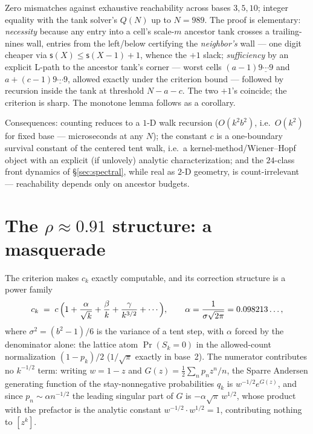 \documentclass[11pt]{article}
\theoremstyle{definition}
\theoremstyle{remark}
\newcommand{\ds}{\mathsf{s}}
\begin{document}
Zero mismatches against exhaustive reachability across bases $3,5,10$; integer
equality with the tank solver's $Q(N)$ up to $N=989$. The proof is elementary:
\emph{necessity} because any entry into a cell's scale-$m$ ancestor tank crosses
a trailing-nines wall, entries from the left/below certifying the
\emph{neighbor's} wall --- one digit cheaper via $\ds(X)\le\ds(X{-}1)+1$, whence
the $+1$ slack; \emph{sufficiency} by an explicit L-path to the ancestor tank's
corner --- worst cells $(a{-}1)\underline{9\cdots9}$ and
$a+(c{-}1)\underline{9\cdots9}$, allowed exactly under the criterion bound ---
followed by recursion inside the tank at threshold $N-a-c$. The two $+1$'s
coincide; the criterion is sharp. The monotone lemma follows as a corollary.

Consequences: counting reduces to a $1$-D walk recursion ($O(k^2b^2)$, i.e.\
$O(k^2)$ for fixed base ---
microseconds at any $N$); the constant $c$ is a one-boundary survival constant of
the centered tent walk, i.e.\ a kernel-method/Wiener--Hopf object with an
explicit (if unlovely) analytic characterization; and the $24$-class front
dynamics of \S\ref{sec:spectral}, while real as $2$-D geometry, is
count-irrelevant --- reachability depends only on ancestor budgets.

\section{The \texorpdfstring{$\rho\approx0.91$}{rho = 0.91} structure: a
masquerade}\label{sec:rho}

The criterion makes $c_k$ exactly computable, and its correction structure is a
power family
\[
c_k \;=\; c\,\Bigl(1+\frac{\alpha}{\sqrt{k}}+\frac{\beta}{k}
+\frac{\gamma}{k^{3/2}}+\cdots\Bigr),
\qquad \alpha=\frac{1}{\sigma\sqrt{2\pi}}=0.098213\ldots,
\]
where $\sigma^2=(b^2-1)/6$ is the variance of a tent step, with $\alpha$
forced by the denominator alone: the lattice atom $\Pr(S_k{=}0)$ in the
allowed-count normalization $(1-p_k)/2$ ($1/\sqrt{\pi}$ exactly in base~2).
The numerator contributes no $k^{-1/2}$ term: writing $w=1-z$ and
$G(z)=\tfrac12\sum_n p_nz^n/n$, the Sparre Andersen generating function of the
stay-nonnegative probabilities $q_k$ is $w^{-1/2}e^{G(z)}$, and since
$p_n\sim\alpha n^{-1/2}$ the leading singular part of $G$ is
$-\alpha\sqrt{\pi}\,w^{1/2}$, whose product with the prefactor is the analytic
constant $w^{-1/2}\cdot w^{1/2}=1$, contributing nothing to $[z^k]$.
\end{document}
